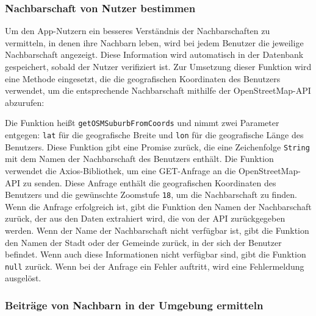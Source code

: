 \subsubsection{Nachbarschaft von Nutzer bestimmen}
Um den App-Nutzern ein besseres Verständnis der Nachbarschaften zu vermitteln, in denen ihre Nachbarn leben, wird bei jedem Benutzer die jeweilige Nachbarschaft angezeigt. Diese Information wird automatisch in der Datenbank gespeichert, sobald der Nutzer verifiziert ist. Zur Umsetzung dieser Funktion wird eine Methode eingesetzt, die die geografischen Koordinaten des Benutzers verwendet, um die entsprechende Nachbarschaft mithilfe der OpenStreetMap-API abzurufen:

Die Funktion heißt \texttt{getOSMSuburbFromCoords} und nimmt zwei Parameter entgegen: \texttt{lat} für die geografische Breite und \texttt{lon} für die geografische Länge des Benutzers. Diese Funktion gibt eine Promise zurück, die eine Zeichenfolge \texttt{String} mit dem Namen der Nachbarschaft des Benutzers enthält. Die Funktion verwendet die Axios-Bibliothek, um eine GET-Anfrage an die OpenStreetMap-API zu senden. Diese Anfrage enthält die geografischen Koordinaten des Benutzers und die gewünschte Zoomstufe \texttt{18}, um die Nachbarschaft zu finden. Wenn die Anfrage erfolgreich ist, gibt die Funktion den Namen der Nachbarschaft zurück, der aus den Daten extrahiert wird, die von der API zurückgegeben werden. Wenn der Name der Nachbarschaft nicht verfügbar ist, gibt die Funktion den Namen der Stadt oder der Gemeinde zurück, in der sich der Benutzer befindet. Wenn auch diese Informationen nicht verfügbar sind, gibt die Funktion \texttt{null} zurück. Wenn bei der Anfrage ein Fehler auftritt, wird eine Fehlermeldung ausgelöst.


\subsubsection{Beiträge von Nachbarn in der Umgebung ermitteln}

